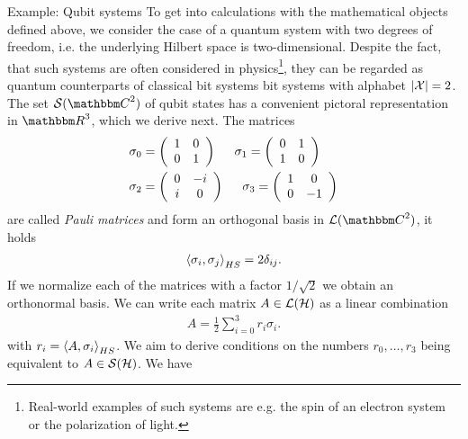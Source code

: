 \begin{section}{Example: Qubit systems} 
  To get into calculations with the mathematical objects defined above, we consider the case of a quantum system with two degrees of freedom, i.e. the underlying Hilbert space is two-dimensional.
  Despite the fact, that such systems are often considered in physics\footnote{Real-world examples of such systems are e.g. the spin of an electron system or the polarization of light.}, they can be 
  regarded as quantum counterparts of classical bit systems bit systems with alphabet $|{\mathcal X}| = 2$. The set $\cS(\bbmC^2)$ of qubit states has a convenient pictoral representation in $\bbmR^3$, which we derive 
  next. The matrices
  \begin{align*} \index{Pauli matrices}
   \sigma_0 &=  \left(\begin{array}{c c} 1 & 0 \\ 0 & 1 \end{array}\right)  \hspace{.5cm}
   \sigma_1 =  \left(\begin{array}{c c} 0 & 1 \\ 1 & 0 \end{array}\right) \\
   \sigma_2 &=  \left(\begin{array}{c c} 0 & - i \\ i & 0 \end{array}\right) \hspace{.5cm}  
   \sigma_3 =  \left(\begin{array}{c c} 1 & 0 \\ 0 & -1 \end{array}\right)  
  \end{align*}
  are called \emph{Pauli matrices} and form an orthogonal basis in $\cL(\bbmC^2)$, it holds  
  \begin{align}
    \braket{\sigma_i, \sigma_j}_{HS} =  2 \delta_{ij}.
  \end{align}
  If we normalize each of the matrices with a factor $1/\sqrt{2}$ we obtain an orthonormal basis. We can write each matrix $A \in {\mathcal L}({\mathcal H})$ as a linear combination
  \begin{align}
   A = \frac{1}{2} \sum_{i=0}^3 r_i \sigma_i. \label{bloch_linear_comb} 
  \end{align}
   with $r_i = \braket{A, \sigma_i}_{HS}$. We aim to derive conditions on the numbers $r_0,\dots,r_3$ being equivalent to $A \in {\mathcal S}({\mathcal H})$. We have
   \begin{enumerate}

\end{enumerate}
\end{section}
